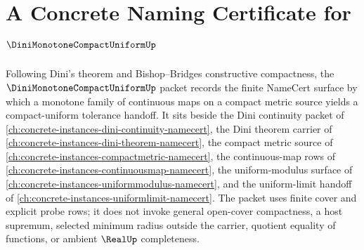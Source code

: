 \chapter{A Concrete Naming Certificate for $\DiniMonotoneCompactUniformUp$}
\label{ch:concrete-instances-dini-monotone-compact-uniform-namecert}

Following Dini's theorem and Bishop--Bridges constructive compactness, the $\DiniMonotoneCompactUniformUp$ packet records the finite NameCert surface by which a monotone family of continuous maps on a compact metric source yields a compact-uniform tolerance handoff. It sits beside the Dini continuity packet of \autoref{ch:concrete-instances-dini-continuity-namecert}, the Dini theorem carrier of \autoref{ch:concrete-instances-dini-theorem-namecert}, the compact metric source of \autoref{ch:concrete-instances-compactmetric-namecert}, the continuous-map rows of \autoref{ch:concrete-instances-continuousmap-namecert}, the uniform-modulus surface of \autoref{ch:concrete-instances-uniformmodulus-namecert}, and the uniform-limit handoff of \autoref{ch:concrete-instances-uniformlimit-namecert}. The packet uses finite cover and explicit probe rows; it does not invoke general open-cover compactness, a host supremum, selected minimum radius outside the carrier, quotient equality of functions, or ambient $\RealUp$ completeness.

